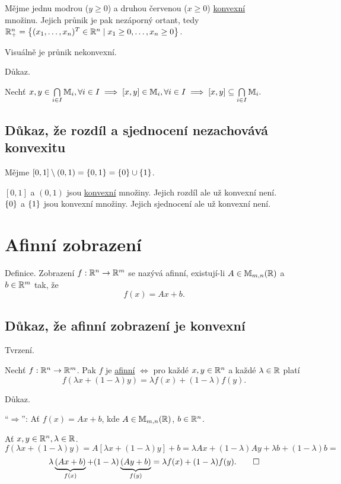 Mějme jednu modrou ($y \geq 0$) a druhou červenou ($x \geq 0$) \hyperref[sec:konvex]{konvexní} \\ množinu. Jejich průnik 
je pak nezáporný ortant, tedy \\
$\mathbb{R}_+^n = \left\lbrace (x_1, \dots, x_n)^T \in \mathbb{R}^n \mid x_1 \geq 0, \dots, x_n \geq 0 \right\rbrace$.

Visuálně je průnik nekonvexní.

Důkaz.

Nechť ${x,y \in \bigcap\limits_{i \in I} \mathbb{M}_{i}, \forall i \in I \implies [x, y] \in \mathbb{M}_i, \forall i \in I
\implies [x,y] \subseteq \bigcap\limits_{i \in I} \mathbb{M}_{i}.}$

\subsection{Důkaz, že rozdíl a sjednocení nezachovává konvexitu}
Mějme $[0,1] \setminus (0,1) = \left\lbrace 0,1 \right\rbrace = \left\lbrace 0 \right\rbrace \cup \left\lbrace 1 \right\rbrace$.

$[0,1]$ a $(0,1)$ jsou \hyperref[sec:konvex]{konvexní} množiny. Jejich rozdíl ale už konvexní není.\\
$\left\lbrace 0 \right\rbrace$ a $\left\lbrace 1 \right\rbrace$ jsou konvexní množiny. Jejich sjednocení ale už konvexní není.

\section*{Afinní zobrazení} \label{sec:afin}
Definice. Zobrazení $f: \mathbb{R}^n \rightarrow \mathbb{R}^m$ se nazývá afinní, existují-li $A \in \mathbb{M}_{m,n} (\mathbb{R})$ a $b \in \mathbb{R}^m$
tak, že \[f(x) = Ax + b.\]

\subsection{Důkaz, že afinní zobrazení je konvexní}
Tvrzení.

Nechť $f: \mathbb{R}^n \rightarrow \mathbb{R}^m$. Pak $f$ je \hyperref[sec:afin]{afinní} $\iff$ pro každé $x,y \in \mathbb{R}^n$ a každé
$\lambda \in \mathbb{R}$ platí
\[f(\lambda x + (1-\lambda) y) =\lambda f(x) + (1-\lambda) f(y)\text{.}\]

Důkaz.

\enquote{$\Rightarrow$}: Ať $f(x) = Ax + b$, kde $A \in \mathbb{M}_{m,n} (\mathbb{R})$, $b \in \mathbb{R}^n$.

Ať $x, y \in \mathbb{R}^n, \lambda \in \mathbb{R}$.
\[
    f(\lambda x + (1 - \lambda) y) = A [\lambda x + (1-\lambda) y] + b = \lambda A x + (1-\lambda)Ay + \lambda b +
    (1-\lambda)b =
\]
\[
    \lambda \underbrace{(Ax + b)}_{f(x)} + (1-\lambda)\underbrace{(Ay + b)}_{f(y)} = \lambda f(x) + (1-\lambda)f(y). 
    \qed
\]

